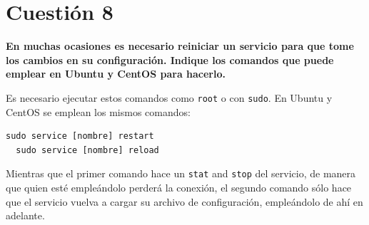 \documentclass[a4paper,11pt]{article}
\newenvironment{answer}{%
\begin{list}{}{%
}%
\item[]}{\end{list}}
\begin{document}
\section{Cuestión 8}
\textbf{En muchas ocasiones es necesario reiniciar un servicio para que tome los cambios en su configuración. Indique los 
comandos que puede emplear en Ubuntu y CentOS para hacerlo.}
\begin{answer}
  Es necesario ejecutar estos comandos como \texttt{root} o con \texttt{sudo}.
  En Ubuntu y CentOS se emplean los mismos comandos:
  \begin{lstlisting}[style=BashInputStyle]
  sudo service [nombre] restart
  sudo service [nombre] reload
  \end{lstlisting}

  Mientras que el primer comando hace un \texttt{stat} and \texttt{stop} del servicio,
  de manera que quien esté empleándolo perderá la conexión, el segundo comando sólo
  hace que el servicio vuelva a cargar su archivo de configuración, empleándolo de
  ahí en adelante.
  
  \cite{diffre}
\end{answer}
\end{document}
